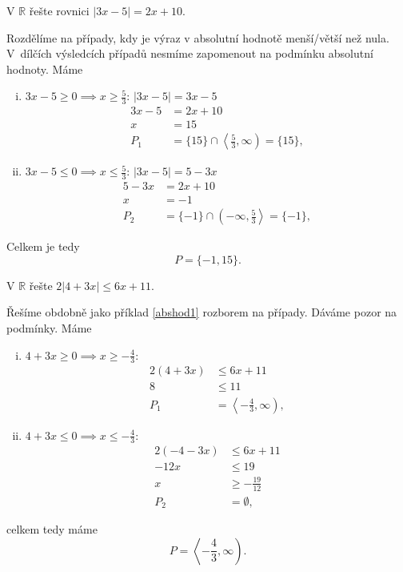 \begin{priklad}\label{abshod1}
V $\mathbb R$ řešte rovnici $|3x-5|=2x+10.$
\end{priklad}

\begin{reseni}
Rozdělíme na případy, kdy je výraz v absolutní hodnotě menší/větší než nula. V~dílčích výsledcích případů nesmíme zapomenout na podmínku absolutní hodnoty. Máme
\begin{enumerate}[i.]
	\item $3x-5 \geq 0\implies x \geq \frac{5}{3}$: $|3x-5|=3x-5$
	\begin{align*}
			3x-5&=2x+10\\
			x&=15\\
			P_1&=\{15\} \cap \left<\frac{5}{3}, \infty \right) = \{15\},
	\end{align*}
	\item $3x-5 \leq 0 \implies x \leq \frac{5}{3}$: $|3x-5| = 5-3x$
	\begin{align*}
		5-3x&=2x+10\\
		x&=-1\\
		P_2&=\{-1\}\cap \left(-\infty, \frac{5}{3} \right> = \{-1\},
	\end{align*}
\end{enumerate}
Celkem je tedy
$$P = \{-1, 15\}.$$
\end{reseni}

\begin{priklad}
V $\mathbb R$ řešte $2|4+3x|\leq 6x+11.$
\end{priklad}

\begin{reseni}
Řešíme obdobně jako příklad \ref{abshod1} rozborem na případy. Dáváme pozor na podmínky. Máme
\begin{enumerate}[i.]
	\item $4+3x \geq 0 \implies x \geq -\frac{4}{3}$:
	\begin{align*}
		2(4+3x)&\leq 6x+11\\
		8 &\leq 11\\
		P_1 &= \left<-\frac{4}{3}, \infty\right),
	\end{align*}
	\item $4+3x \leq 0 \implies x \leq -\frac{4}{3}$:
	\begin{align*}
		2(-4-3x)&\leq 6x+11\\
		-12x &\leq 19\\
		x &\geq -\frac{19}{12}\\
		P_2 &= \emptyset,
	\end{align*}
\end{enumerate}
celkem tedy máme
$$P = \left<-\frac{4}{3}, \infty\right).$$
\end{reseni}

